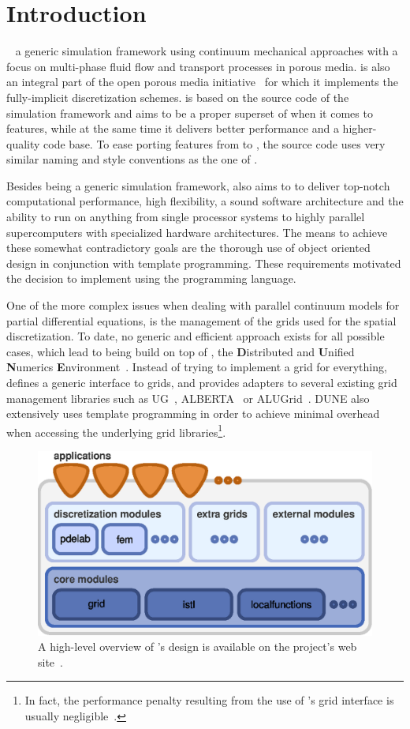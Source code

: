 \chapter{Introduction}

\eWoms~\cite{EWOMS-HP} a generic simulation framework using continuum
mechanical approaches with a focus on multi-phase fluid flow and
transport processes in porous media. \eWoms is also an integral part
of the open porous media initiative~\cite{OPM-HP} for which it
implements the fully-implicit discretization schemes. \eWoms is based
on the source code of the \Dumux~\cite{DUMUX-HP} simulation framework
and aims to be a proper superset of \Dumux when it comes to features,
while at the same time it delivers better performance and a
higher-quality code base. To ease porting features from \Dumux to
\eWoms, the \eWoms source code uses very similar naming and style
conventions as the one of \Dumux.

Besides being a generic simulation framework, \eWoms also aims to to
deliver top-notch computational performance, high flexibility, a sound
software architecture and the ability to run on anything from single
processor systems to highly parallel supercomputers with specialized
hardware architectures. The means to achieve these somewhat
contradictory goals are the thorough use of object oriented design in
conjunction with template programming. These requirements motivated
the decision to implement \eWoms using the \Cplusplus programming
language.

One of the more complex issues when dealing with parallel continuum
models for partial differential equations, is the management of the
grids used for the spatial discretization. To date, no generic and
efficient approach exists for all possible cases, which lead to \eWoms
being build on top of \Dune, the \textbf{D}istributed and
\textbf{U}nified \textbf{N}umerics
\textbf{E}nvironment~\cite{DUNE-HP}. Instead of trying to implement a
grid for everything, \Dune defines a generic \Cplusplus interface to
grids, and provides adapters to several existing grid management
libraries such as UG~\cite{UG-HP}, ALBERTA~\cite{ALBERTA-HP} or
ALUGrid~\cite{ALUGRID-HP}. DUNE also extensively uses template
programming in order to achieve minimal overhead when accessing the
underlying grid libraries\footnote{In fact, the performance penalty
  resulting from the use of \Dune's grid interface is usually
  negligible~\cite{BURRI2006}.}.
\begin{figure}[hbt]
  \centering
  \includegraphics[width=.5\linewidth, keepaspectratio]{EPS/dunedesign}
  \caption{
    \label{fig:dune-design}
    A high-level overview of \Dune's design is available on the project's
    web site~\cite{DUNE-HP}.
  }
\end{figure}

